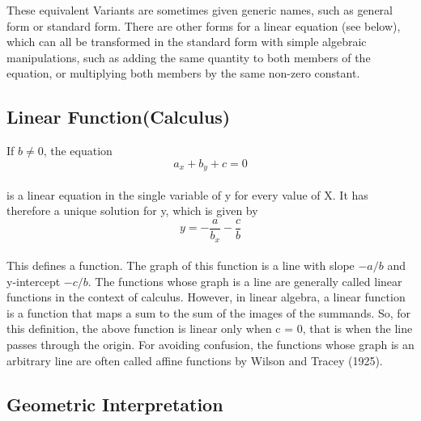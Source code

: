 \documentclass[a4paper, 12pt]{report}
\begin{document}
{         These equivalent Variants are sometimes given generic names, such as general form or standard form.
         There are other forms for a linear equation (see below), which can all be transformed in the standard form with simple algebraic manipulations, such as adding the same quantity to both members of the equation, or multiplying both members by the same non-zero constant.\\
         
         \subsection{Linear Function(Calculus)}
         If $b \neq 0$, the equation 
         \begin{equation}
         a_x + b_y + c = 0
         \end{equation}\\
         is a linear equation in the single variable of y for every value of X. It has therefore a unique solution for y, which is given by
         \begin{equation}
         y = -\frac{a}{b_x} - \frac{c}{b}
         \end{equation}\\
         This defines a function. The graph of this function is a line with slope $-a/b$ and y-intercept $-c/b$. The functions whose graph is a line are generally called linear functions in the context of calculus. However, in linear algebra, a linear function is a function that maps a sum to the sum of the images of the summands. So, for this definition, the above function is linear only when c = 0, that is when the line passes through the origin. For avoiding confusion, the functions whose graph is an arbitrary line are often called affine functions by Wilson and Tracey (1925).\\
         
         \subsection{Geometric Interpretation}
         \begin{center}
         	\begin{figure}[!hbt]
         		\begin{minipage}[c]{0.5\linewidth}
\end{minipage}
\end{figure}
\end{center}}
\end{document}
